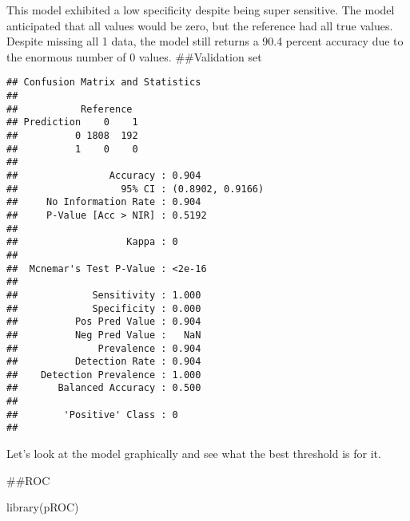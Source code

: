 \documentclass[
]{article}
\newenvironment{Shaded}{\begin{snugshade}}{\end{snugshade}}
\newcommand{\AttributeTok}[1]{\textcolor[rgb]{0.77,0.63,0.00}{#1}}
\newcommand{\FunctionTok}[1]{\textcolor[rgb]{0.00,0.00,0.00}{#1}}
\newcommand{\NormalTok}[1]{#1}
\newcommand{\OtherTok}[1]{\textcolor[rgb]{0.56,0.35,0.01}{#1}}
\newcommand{\SpecialCharTok}[1]{\textcolor[rgb]{0.00,0.00,0.00}{#1}}
\newcommand{\StringTok}[1]{\textcolor[rgb]{0.31,0.60,0.02}{#1}}
\begin{document}
This model exhibited a low specificity despite being super sensitive.
The model anticipated that all values would be zero, but the reference
had all true values. Despite missing all 1 data, the model still returns
a 90.4 percent accuracy due to the enormous number of 0 values.
\#\#Validation set

\begin{Shaded}
\end{Shaded}

\begin{verbatim}
## Confusion Matrix and Statistics
## 
##           Reference
## Prediction    0    1
##          0 1808  192
##          1    0    0
##                                           
##                Accuracy : 0.904           
##                  95% CI : (0.8902, 0.9166)
##     No Information Rate : 0.904           
##     P-Value [Acc > NIR] : 0.5192          
##                                           
##                   Kappa : 0               
##                                           
##  Mcnemar's Test P-Value : <2e-16          
##                                           
##             Sensitivity : 1.000           
##             Specificity : 0.000           
##          Pos Pred Value : 0.904           
##          Neg Pred Value :   NaN           
##              Prevalence : 0.904           
##          Detection Rate : 0.904           
##    Detection Prevalence : 1.000           
##       Balanced Accuracy : 0.500           
##                                           
##        'Positive' Class : 0               
## 
\end{verbatim}

Let's look at the model graphically and see what the best threshold is
for it.

\#\#ROC

\begin{Shaded}
\begin{Highlighting}[]
\FunctionTok{library}\NormalTok{(pROC)}
\end{Highlighting}
\end{Shaded}
\end{document}
